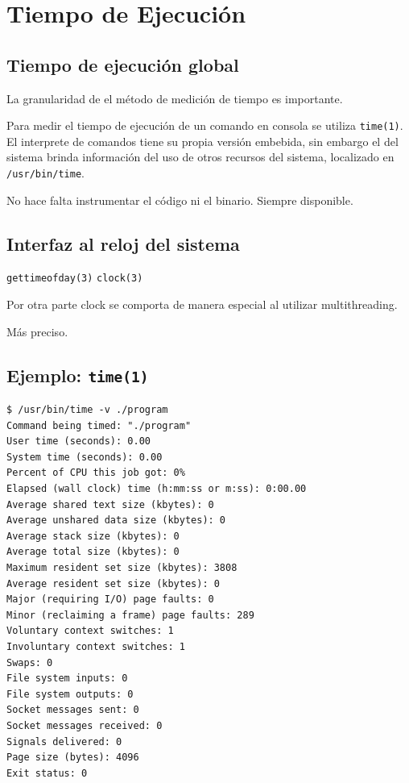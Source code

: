 \documentclass[a4paper]{report}
\begin{document}
\section{Tiempo de Ejecución}

\subsection{Tiempo de ejecución global}

La granularidad de el método de medición de tiempo es importante.

\bigskip

Para medir el tiempo de ejecución de un comando en consola se utiliza {\tt time(1)}. El interprete de comandos tiene su propia versión embebida, sin embargo el del sistema brinda información del uso de otros recursos del sistema, localizado en {\tt /usr/bin/time}.

\bigskip

No hace falta instrumentar el código ni el binario. Siempre disponible.

\subsection{Interfaz al reloj del sistema}

{\tt gettimeofday(3)}
{\tt clock(3)}

Por otra parte clock se comporta de manera especial al utilizar multithreading.

Más preciso.

\subsection{Ejemplo: {\tt time(1)}}

\begin{lstlisting} 
$ /usr/bin/time -v ./program
Command being timed: "./program"
User time (seconds): 0.00
System time (seconds): 0.00
Percent of CPU this job got: 0%
Elapsed (wall clock) time (h:mm:ss or m:ss): 0:00.00
Average shared text size (kbytes): 0
Average unshared data size (kbytes): 0
Average stack size (kbytes): 0
Average total size (kbytes): 0
Maximum resident set size (kbytes): 3808
Average resident set size (kbytes): 0
Major (requiring I/O) page faults: 0
Minor (reclaiming a frame) page faults: 289
Voluntary context switches: 1
Involuntary context switches: 1
Swaps: 0
File system inputs: 0
File system outputs: 0
Socket messages sent: 0
Socket messages received: 0
Signals delivered: 0
Page size (bytes): 4096
Exit status: 0
\end{lstlisting}
\end{document}
